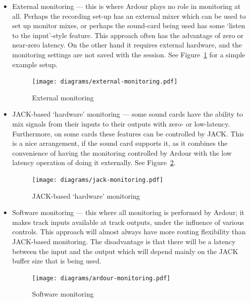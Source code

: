 \documentclass[10pt,a4paper]{book}
\begin{document}
\begin{itemize}
\item External monitoring --- this is where Ardour plays no role in
  monitoring at all.  Perhaps the recording set-up has an external
  mixer which can be used to set up monitor mixes, or perhaps the
  sound-card being used has some `listen to the input'-style feature.
  This approach often has the advantage of zero or near-zero latency.
  On the other hand it requires external hardware, and the monitoring
  settings are not saved with the session.  See
  Figure~\ref{fig:external-monitoring} for a simple example setup.

\begin{figure}[ht]
\begin{center}
\texttt{[image: diagrams/external-monitoring.pdf]}
\end{center}
\caption{External monitoring}
\label{fig:external-monitoring}
\end{figure}

\item JACK-based `hardware' monitoring --- some sound cards have the
  ability to mix signals from their inputs to their outputs with zero-
  or low-latency.  Furthermore, on some cards these features can be
  controlled by JACK\@.  This is a nice arrangement, if the sound card
  supports it, as it combines the convenience of having the monitoring
  controlled by Ardour with the low latency operation of doing it
  externally.  See Figure~\ref{fig:jack-monitoring}.

\begin{figure}[ht]
\begin{center}
\texttt{[image: diagrams/jack-monitoring.pdf]}
\end{center}
\caption{JACK-based `hardware' monitoring}
\label{fig:jack-monitoring}
\end{figure}

\item Software monitoring --- this where all monitoring is performed
  by Ardour; it makes track inputs available at track outputs, under
  the influence of various controls.  This approach will almost always
  have more routing flexibility than JACK-based monitoring.  The
  disadvantage is that there will be a latency between the input and
  the output which will depend mainly on the JACK buffer size that is
  being used.

\begin{figure}[ht]
\begin{center}
\texttt{[image: diagrams/ardour-monitoring.pdf]}
\end{center}
\caption{Software monitoring}
\label{fig:ardour-monitoring}
\end{figure}

\end{itemize}
\end{document}
